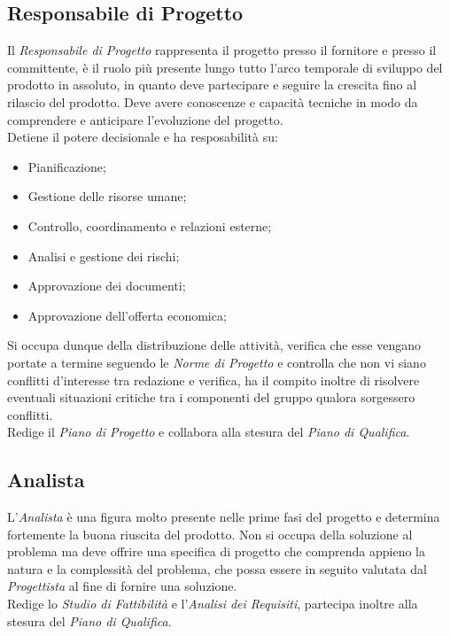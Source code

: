 \documentclass{scalatekids-article}
\begin{document}
\subsection{Responsabile di Progetto}
Il \textit{Responsabile di Progetto} rappresenta il progetto presso il fornitore
e presso il committente, è il ruolo più presente lungo tutto l'arco temporale di
sviluppo del prodotto in assoluto, in quanto deve partecipare e seguire la
crescita fino al rilascio del prodotto. Deve avere conoscenze e capacità
tecniche in modo da comprendere e anticipare l'evoluzione del progetto.\\
Detiene il potere decisionale e ha resposabilità su:
\begin{itemize}
  \item Pianificazione;
  \item Gestione delle risorse umane;
  \item Controllo, coordinamento e relazioni esterne;
  \item Analisi e gestione dei rischi;
  \item Approvazione dei documenti;
  \item Approvazione dell'offerta economica;
\end{itemize}
Si occupa dunque della distribuzione delle attività, verifica che esse vengano
portate a termine seguendo le \textit{Norme di Progetto} e controlla che non vi
siano conflitti d'interesse tra redazione e verifica, ha il compito inoltre di
risolvere eventuali situazioni critiche tra i componenti del gruppo qualora
sorgessero conflitti.\\ Redige il \textit{Piano di Progetto} e collabora alla
stesura del \textit{Piano di Qualifica}.
\subsection{Analista}
L'\textit{Analista} è una figura molto presente nelle prime fasi del progetto e
determina fortemente la buona riuscita del prodotto. Non si occupa della
soluzione al problema ma deve offrire una specifica di progetto che comprenda
appieno la natura e la complessità del problema, che possa essere in seguito
valutata dal \textit{Progettista} al fine di fornire una soluzione.\\ Redige lo
\textit{Studio di Fattibilità} e l'\textit{Analisi dei Requisiti}, partecipa
inoltre alla stesura del \textit{Piano di Qualifica}.
\end{document}
